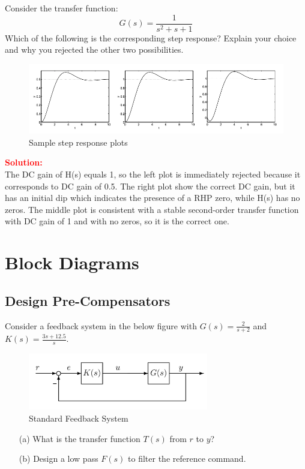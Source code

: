 \documentclass[12pt]{article}
\begin{document}
Consider the transfer function:
\[
G(s)=\frac{1}{s^2+s+1}
\]
Which of the following is the corresponding step response? Explain your choice and why you rejected the other two possibilities.

\begin{figure}[h!]
    \centering
    \includegraphics[width=1\linewidth]{figs/3.21.png}
    \caption{Sample step response plots}
    \label{fig:prb50}
\end{figure}
\textbf{\textcolor{red}{Solution:}} \\
The DC gain of H(s) equals 1, so the left plot is immediately rejected because it corresponds to DC gain of 0.5. The right plot show the correct DC gain, but it has an initial dip which indicates the presence of a RHP zero, while H(s) has no zeros. The middle plot is consistent with a stable second-order transfer function with DC gain of 1 and with no zeros, so it is the correct one.

\clearpage
\section{Block Diagrams}
\subsection{Design Pre-Compensators}

Consider a feedback system in the below figure with $G(s) = \frac{2}{s+2}$ and $K(s) = \frac{3s + 12.5}{s}$.
\begin{figure}[h]
    \centering
    \includegraphics[width=0.7\textwidth]{figs/4.1.png}
    \caption{Standard Feedback System}
    \label{fig:4.1}
\end{figure}
\begin{itemize}
    \item[(a)]  What is the transfer function $T(s)$ from $r$ to $y$?
    \item[(b)] Design a low pass $F(s)$ to filter the reference command.
\end{itemize}
\end{document}

